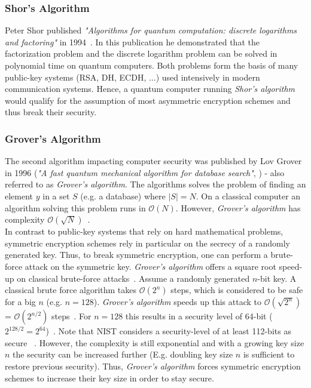\subsubsection{Shor's Algorithm}
Peter Shor published \textit{"Algorithms for quantum computation: discrete logarithms and factoring"} in 1994~\parencite{shor1994algorithms}. In this publication he demonstrated that the factorization problem and the discrete logarithm problem can be solved in polynomial time on quantum computers. Both problems form the basis of many public-key systems (\gls{RSA}, \gls{DH}, \gls{ECDH}, ...) used intensively in modern communication systems. Hence, a quantum computer running \textit{Shor's algorithm} would qualify for the assumption of most asymmetric encryption schemes and thus break their security.


\subsubsection{Grover's Algorithm}
The second algorithm impacting computer security was published by Lov Grover in 1996 (\textit{"A fast quantum mechanical algorithm for database search"}, \parencite{grover1996fast}) - also referred to as \textit{Grover's algorithm}. The algorithms solves the problem of finding an element $y$ in a set $S$ (e.g. a database) where $|S| = N$. On a classical computer an algorithm solving this problem runs in $\mathcal{O}(N)$. However, \textit{Grover's algorithm} has complexity $\mathcal{O}(\sqrt{N})$~\parencite{nielsen2002quantum}.\\
In contrast to public-key systems that rely on hard mathematical problems, symmetric encryption schemes rely in particular on the secrecy of a randomly generated key. 
Thus, to break symmetric encryption, one can perform a brute-force attack on the symmetric key. \textit{Grover's algorithm} offers a square root speed-up on classical brute-force attacks~\parencite{mavroeidis2018impact}. Assume a randomly generated $n$-bit key. A classical brute force algorithm takes $\mathcal{O}(2^n)$ steps, which is considered to be safe for a big $n$ (e.g. $n=128$). \textit{Grover's algorithm} speeds up this attack to $\mathcal{O}(\sqrt{2^n})$ = $\mathcal{O}(2^{n/2})$ steps~\parencite{mavroeidis2018impact}. For $n=128$ this results in a security level of 64-bit ($2^{128/2}=2^{64}$)~\parencite{mavroeidis2018impact}. Note that \gls{NIST} considers a security-level of at least 112-bits as secure ~\parencite{barker2019transitioning}.  However, the complexity is still exponential and with a growing key size $n$ the security can be increased further (E.g. doubling key size $n$ is sufficient to restore previous security). Thus, \textit{Grover's algorithm} forces symmetric encryption schemes to increase their key size in order to stay secure.
